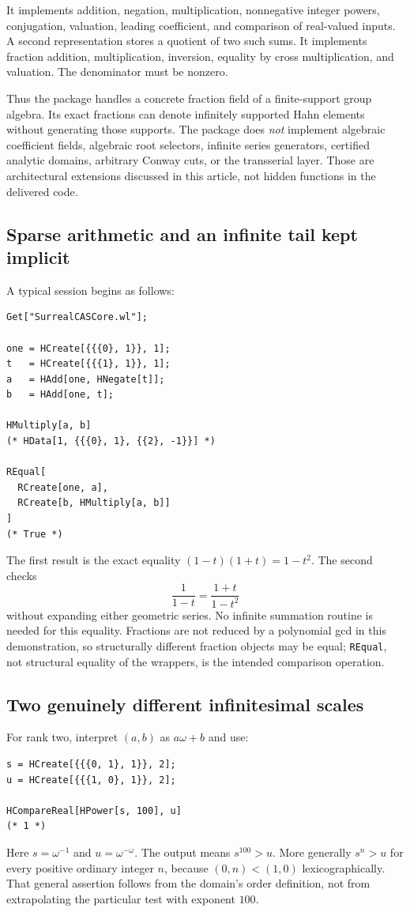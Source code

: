\documentclass[11pt,letterpaper]{article}
\numberwithin{equation}{section}
\theoremstyle{definition}
\theoremstyle{remark}\newtheorem{remark}[theorem]{Remark}
\begin{document}
It implements addition, negation, multiplication, nonnegative integer powers,
conjugation, valuation, leading coefficient, and comparison of real-valued
inputs. A second representation stores a quotient of two such sums. It
implements fraction addition, multiplication, inversion, equality by cross
multiplication, and valuation. The denominator must be nonzero.

Thus the package handles a concrete fraction field of a finite-support group
algebra. Its exact fractions can denote infinitely supported Hahn elements
without generating those supports. The package does \emph{not} implement
algebraic coefficient fields, algebraic root selectors, infinite series
generators, certified analytic domains, arbitrary Conway cuts, or the
transserial layer. Those are architectural extensions discussed in this
article, not hidden functions in the delivered code.

\subsection{Sparse arithmetic and an infinite tail kept implicit}
A typical session begins as follows:
\begin{lstlisting}
Get["SurrealCASCore.wl"];

one = HCreate[{{{0}, 1}}, 1];
t   = HCreate[{{{1}, 1}}, 1];
a   = HAdd[one, HNegate[t]];
b   = HAdd[one, t];

HMultiply[a, b]
(* HData[1, {{{0}, 1}, {{2}, -1}}] *)

REqual[
  RCreate[one, a],
  RCreate[b, HMultiply[a, b]]
]
(* True *)
\end{lstlisting}
The first result is the exact equality $(1-t)(1+t)=1-t^2$.
The second checks
\[
 \frac1{1-t}=\frac{1+t}{1-t^2}
\]
without expanding either geometric series. No infinite summation routine is
needed for this equality. Fractions are not reduced by a polynomial gcd in
this demonstration, so structurally different fraction objects may be equal;
\texttt{REqual}, not structural equality of the wrappers, is the intended
comparison operation.

\subsection{Two genuinely different infinitesimal scales}
For rank two, interpret $(a,b)$ as $a\omega+b$ and use:
\begin{lstlisting}
s = HCreate[{{{0, 1}, 1}}, 2];
u = HCreate[{{{1, 0}, 1}}, 2];

HCompareReal[HPower[s, 100], u]
(* 1 *)
\end{lstlisting}
Here $s=\omega^{-1}$ and $u=\omega^{-\omega}$. The output means
$s^{100}>u$. More generally $s^n>u$ for every positive ordinary integer $n$,
because $(0,n)<(1,0)$ lexicographically. That general assertion follows from
the domain's order definition, not from extrapolating the particular test
with exponent $100$.
\end{document}
